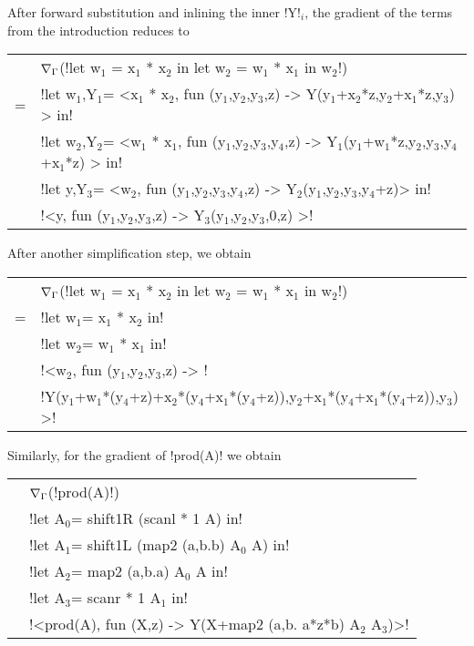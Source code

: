 \begin{example}
    After forward substitution and inlining the inner !Y!$_{i}$, the gradient of the terms from the introduction reduces to

    \begin{tabular}{c l}
        & $\nabla_\Gamma$(!let w$_{1}$ = x$_{1}$ * x$_{2}$ in let w$_{2}$ = w$_{1}$ * x$_{1}$ in w$_{2}$!) \\
        =& !let w$_1$,Y$_1$= <x$_1$ * x$_{2}$, fun (y$_{1}$,y$_{2}$,y$_{3}$,z) -> Y(y$_{1}$+x$_2$*z,y$_{2}$+x$_1$*z,y$_{3}$) > in! \\
        & !let w$_{2}$,Y$_{2}$= <w$_{1}$ * x$_{1}$, fun (y$_{1}$,y$_{2}$,y$_{3}$,y$_{4}$,z) -> Y$_{1}$(y$_{1}$+w$_1$*z,y$_{2}$,y$_{3}$,y$_{4}$+x$_{1}$*z) > in! \\
        & !let y,Y$_{3}$= <w$_{2}$, fun (y$_{1}$,y$_{2}$,y$_{3}$,y$_{4}$,z) -> Y$_{2}$(y$_{1}$,y$_{2}$,y$_{3}$,y$_{4}$+z)> in! \\
        & !<y, fun (y$_{1}$,y$_{2}$,y$_{3}$,z) -> Y$_{3}$(y$_{1}$,y$_{2}$,y$_{3}$,0,z) >!
    \end{tabular}

After another simplification step, we obtain 

\begin{tabular}{c l}
    & $\nabla_\Gamma$(!let w$_{1}$ = x$_{1}$ * x$_{2}$ in let w$_{2}$ = w$_{1}$ * x$_{1}$ in w$_{2}$!) \\
    =& !let w$_1$= x$_1$ * x$_{2}$ in! \\
        & !let w$_{2}$= w$_{1}$ * x$_{1}$ in! \\
        & !<w$_{2}$, fun (y$_{1}$,y$_{2}$,y$_{3}$,z) -> !\\
        & \quad\quad\quad!Y(y$_{1}$+w$_1$*(y$_4$+z)+x$_2$*(y$_4$+x$_1$*(y$_4$+z)),y$_{2}$+x$_1$*(y$_4$+x$_1$*(y$_4$+z)),y$_{3}$) >!
\end{tabular}

Similarly, for the gradient of !prod(A)! we obtain

\begin{tabular}{c l}
        & $\nabla_\Gamma$(!prod(A)!) \\
        & !let A$_{0}$= shift1R (scanl * 1 A) in!\\
        & !let A$_{1}$= shift1L (map2 (a,b.b) A$_{0}$ A) in!\\
        & !let A$_{2}$= map2 (a,b.a) A$_{0}$ A in!\\
        & !let A$_{3}$= scanr * 1 A$_{1}$ in!\\
        & !<prod(A), fun (X,z) -> Y(X+map2 (a,b. a*z*b) A$_{2}$ A$_{3}$)>! 
    \end{tabular}
\end{example}

